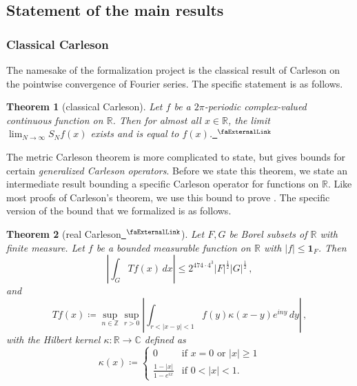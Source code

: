 \documentclass[12pt]{amsart}
\newcommand*{\complex}{\mathbb{C}} %
\newcommand*{\real}{\mathbb{R}} %
\newcommand{\extlink}{~\ensuremath{{}^\text{\faExternalLink}}}
\theoremstyle{definition}
\theoremstyle{plain}
\newtheorem{theorem}{Theorem}[subsection]
\begin{document}

\subsection{Statement of the main results}\label{subsec:main_results}

\subsubsection{Classical Carleson}\label{subsubsec:classical-result}

The namesake of the formalization project is the classical result of Carleson on the pointwise convergence of Fourier series.
The specific statement is as follows.

\begin{theorem}[classical Carleson]
    \label{classical-carleson}
    Let $f$ be a $2\pi$-periodic complex-valued continuous function on $\mathbb{R}$.
    Then for almost all $x \in \mathbb{R}$, the limit
    $\lim_{N\to\infty} S_N f(x)$ exists and is equal to $f(x)$.\href{https://github.com/fpvandoorn/carleson/blob/020d6e5c71d731952eb0379d222eea4049103ca0/Carleson/Classical/ClassicalCarleson.lean#L131}{\extlink}
\end{theorem}

The metric Carleson theorem is more complicated to state, but gives bounds for certain \emph{generalized Carleson operators}.
Before we state this theorem, we state an intermediate result
bounding a specific Carleson operator for functions on $\real$.
Like most proofs of Carleson's theorem, we use this bound to prove .
The specific version of the bound that we formalized is as follows.

\begin{theorem}[real Carleson\href{https://github.com/fpvandoorn/carleson/blob/020d6e5c71d731952eb0379d222eea4049103ca0/Carleson/Classical/CarlesonOnTheRealLineContinuous.lean\#L29}{\extlink}]\label{real-Carleson}
    Let $F,G$ be Borel subsets of $\real$ with finite measure. Let $f$ be a bounded measurable function on $\real$ with $|f|\le \mathbf{1}_F$. Then
\begin{equation*}
    \left|\int _G Tf(x) \, dx\right| \le 2^{474 \cdot 4^3} |F|^{\frac 12} |G|^{\frac 12} \, ,
\end{equation*}
and
\begin{equation*}
    T f(x)\coloneq\sup_{n\in \mathbb{Z}}
    \sup_{r>0}\left|\int_{r<|x-y|<1} f(y)\kappa(x-y) e^{iny}\, dy\right| \, ,
\end{equation*}
with the Hilbert kernel $\kappa\colon\real\to\complex$ defined as
\begin{equation*}
    \kappa(x)\coloneq\begin{cases}
        0 & \text{if $x = 0$ or $|x| \ge 1$} \\
        \frac { 1-|x|}{1-e^{ix}} & \text{if $0 < |x| < 1$}.
    \end{cases}
\end{equation*}
\end{theorem}
\end{document}
